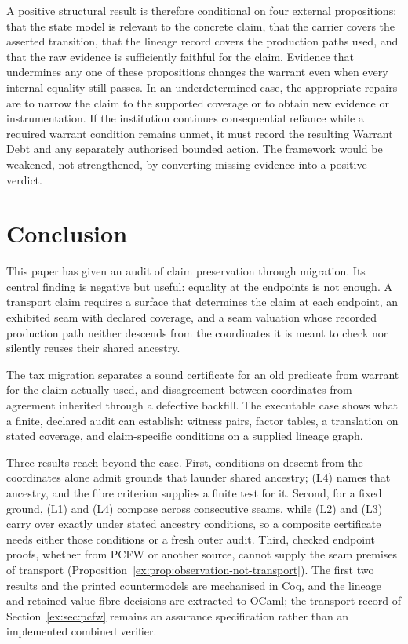 \documentclass[smallextended,envcountsect,envcountsame,natbib]{svjour3}
\begin{document}
A positive structural result is therefore conditional on four external propositions: that the state model is relevant to the concrete claim, that the carrier covers the asserted transition, that the lineage record covers the production paths used, and that the raw evidence is sufficiently faithful for the claim. Evidence that undermines any one of these propositions changes the warrant even when every internal equality still passes. In an underdetermined case, the appropriate repairs are to narrow the claim to the supported coverage or to obtain new evidence or instrumentation. If the institution continues consequential reliance while a required warrant condition remains unmet, it must record the resulting Warrant Debt and any separately authorised bounded action. The framework would be weakened, not strengthened, by converting missing evidence into a positive verdict.

\section{Conclusion}\label{ex:sec:conclusion}
This paper has given an audit of claim preservation through migration. Its central finding is negative but useful: equality at the endpoints is not enough. A transport claim requires a surface that determines the claim at each endpoint, an exhibited seam with declared coverage, and a seam valuation whose recorded production path neither descends from the coordinates it is meant to check nor silently reuses their shared ancestry.

The tax migration separates a sound certificate for an old predicate from warrant for the claim actually used, and disagreement between coordinates from agreement inherited through a defective backfill. The executable case shows what a finite, declared audit can establish: witness pairs, factor tables, a translation on stated coverage, and claim-specific conditions on a supplied lineage graph.

Three results reach beyond the case. First, conditions on descent from the coordinates alone admit grounds that launder shared ancestry; (L4) names that ancestry, and the fibre criterion supplies a finite test for it. Second, for a fixed ground, (L1) and (L4) compose across consecutive seams, while (L2) and (L3) carry over exactly under stated ancestry conditions, so a composite certificate needs either those conditions or a fresh outer audit. Third, checked endpoint proofs, whether from PCFW or another source, cannot supply the seam premises of transport (Proposition~\ref{ex:prop:observation-not-transport}). The first two results and the printed countermodels are mechanised in Coq, and the lineage and retained-value fibre decisions are extracted to OCaml; the transport record of Section~\ref{ex:sec:pcfw} remains an assurance specification rather than an implemented combined verifier.
\end{document}
